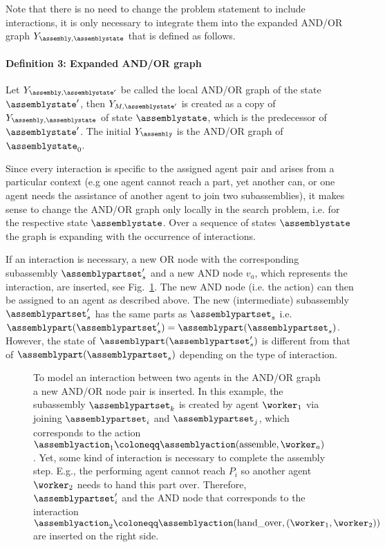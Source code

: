Note that there is no need to change the problem statement to include interactions, it is only necessary to integrate them into the expanded AND/OR graph $Y_{\assembly,\assemblystate}$ that is defined as follows.

\paragraph{Definition 3: Expanded AND/OR graph}

Let $Y_{\assembly,\assemblystate^\prime}$ be called the local AND/OR graph of the state $\assemblystate^\prime$, then $Y_{M,\assemblystate^\prime}$ is created as a copy of $Y_{\assembly,\assemblystate}$ of state $\assemblystate$, which is the predecessor of $\assemblystate^\prime$.
The initial $Y_\assembly$ is the AND/OR graph of $\assemblystate_0$.

Since every interaction is specific to the assigned agent pair and arises from a particular context (e.g one agent cannot reach a part, yet another can, or one agent needs the assistance of another agent to join two subassemblies), it makes sense to change the AND/OR graph only locally in the search problem, i.e. for the respective state $\assemblystate$.
Over a sequence of states $\assemblystate$ the graph is expanding with the occurrence of interactions.

If an interaction is necessary, a new OR node with the corresponding subassembly $\assemblypartset^\prime_s$ and a new AND node $v_a$, which represents the interaction, are inserted, see Fig.~\ref{fig:applications:planner:interaction}.
The new AND node (i.e. the action) can then be assigned to an agent as described above.
The new (intermediate) subassembly $\assemblypartset^\prime_s$ has the same parts as $\assemblypartset_s$ i.e. $\assemblypart(\assemblypartset^\prime_s)=\assemblypart(\assemblypartset_s)$.
However, the state of $\assemblypart(\assemblypartset^\prime_s)$ is different from that of $\assemblypart(\assemblypartset_s)$ depending on the type of interaction. 

\begin{figure}[ht!]
\begin{center}

\caption{To model an interaction between two agents in the AND/OR graph a new AND/OR node pair is inserted.
In this example, the subassembly $\assemblypartset_k$ is created by agent $\worker_1$ via joining $\assemblypartset_i$ and $\assemblypartset_j$, which corresponds to the action $\assemblyaction_1 \coloneqq \assemblyaction(\text{assemble},\worker_a)$.
Yet, some kind of interaction is necessary to complete the assembly step.
E.g., the performing agent cannot reach $P_i$ so another agent $\worker_2$ needs to hand this part over.
Therefore, $\assemblypartset^\prime_i$ and the AND node that corresponds to the interaction $\assemblyaction_2 \coloneqq \assemblyaction(\text{hand\_over},(\worker_1,\worker_2))$ are inserted on the right side.}
\label{fig:applications:planner:interaction}
\end{center}
\end{figure}


